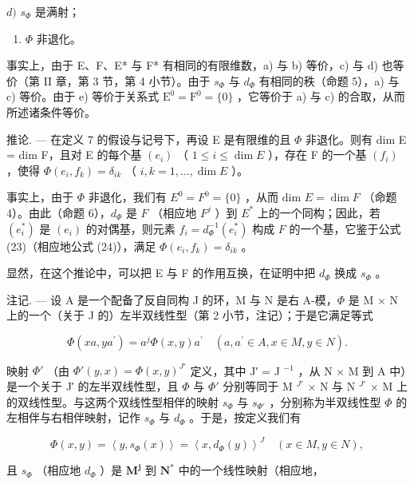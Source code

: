 \(d)\) \(s_{\Phi}\) 是满射；

\begin{enumerate}
\def\labelenumi{\alph{enumi})}
\setcounter{enumi}{4}
\tightlist
\item
  \(\Phi\) 非退化。
\end{enumerate}

事实上，由于 E、F、E* 与 F* 有相同的有限维数，a) 与 b) 等价，c) 与 d) 也等价（第 II 章，第 3 节，第 4 小节）。由于 \(s_{\Phi}\) 与 \(d_{\Phi}\) 有相同的秩（命题 5），a) 与 c) 等价。由于 e) 等价于关系式 \(\mathrm{E}^{0} = \mathrm{F}^{0} = \{0\}\) ，它等价于 a) 与 c) 的合取，从而所述诸条件等价。

推论. --- 在定义 7 的假设与记号下，再设 E 是有限维的且 \(\Phi\) 非退化。则有 dim E = dim F，且对 E 的每个基 \((e_i)\) （ \(1 \leqslant i \leqslant \dim E\) ），存在 F 的一个基 \((f_i)\) ，使得 \(\Phi(e_i, f_k) = \delta_{ik}\) （ \(i, k = 1, \ldots, \dim E\) ）。

事实上，由于 \(\Phi\) 非退化，我们有 \(E^{0} = F^{0} = \{0\}\) ，从而 dim \(E = \dim F\) （命题 4）。由此（命题 6），\(d_{\Phi}\) 是 \(F\) （相应地 \(F^{j}\) ）到 \(E^{*}\) 上的一个同构；因此，若 \((e_{i}^{*})\) 是 \((e_{i})\) 的对偶基，则元素 \(f_{i} = d_{\Phi}^{-1}(e_{i}^{*})\) 构成 \(F\) 的一个基，它鉴于公式 (23)（相应地公式 (24)），满足 \(\Phi(e_{i}, f_{k}) = \delta_{ik}\) 。

显然，在这个推论中，可以把 E 与 F 的作用互换，在证明中把 \(d_{\Phi}\) 换成 \(s_{\Phi}\) 。

注记. --- 设 A 是一个配备了反自同构 J 的环，M 与 N 是右 A-模，\(\Phi\) 是 M × N 上的一个（关于 J 的）左半双线性型（第 2 小节，注记）；于是它满足等式

\[
\Phi (x a, y a ^ {\prime}) = a ^ {j} \Phi (x, y) a ^ {\prime} \quad (a, a ^ {\prime} \in A, x \in M, y \in N).
\]

映射 \(\Phi'\) （由 \(\Phi'(y, x) = \Phi(x, y)^{J'}\) 定义，其中 J′ = J \(^{-1}\) ，从 N × M 到 A 中）是一个关于 J′ 的左半双线性型，且 \(\Phi\) 与 \(\Phi'\) 分别等同于 M \(^{J'}\) × N 与 N \(^{J'}\) × M 上的双线性型。与这两个双线性型相伴的映射 \(s_{\Phi}\) 与 \(s_{\Phi'}\) ，分别称为半双线性型 \(\Phi\) 的左相伴与右相伴映射，记作 \(s_{\Phi}\) 与 \(d_{\Phi}\) 。于是，按定义我们有

\[
\Phi (x, y) = \left\langle y, s _ {\Phi} (x) \right\rangle = \left\langle x, d _ {\Phi} (y) \right\rangle^ {J} \quad (x \in M, y \in N),\tag{26}
\]

且 \(s_{\Phi}\) （相应地 \(d_{\Phi}\) ）是 \(\mathbf{M}^{\mathbf{j}}\) 到 \(\mathbf{N}^{*}\) 中的一个线性映射（相应地，

